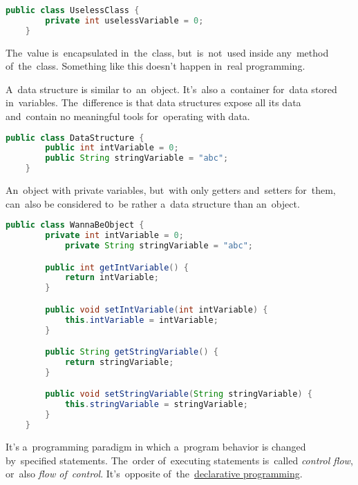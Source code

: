 \begin{lstlisting}[language=Java]
    public class UselessClass {
        private int uselessVariable = 0;
    }
\end{lstlisting}

\noindent The~value is~encapsulated in~the~class, but~is~not~used inside any~method of~the~class. Something like this doesn't happen in~real programming.

\label{objectdatastructure}
A~data structure is similar to~an~object. It's~also a~container for~data stored in~variables. The~difference is that data structures expose all its data and~contain no meaningful tools for~operating with data.

\begin{lstlisting}[language=Java]
    public class DataStructure {
        public int intVariable = 0;
        public String stringVariable = "abc";
    }
\end{lstlisting}

\noindent An~object with private variables, but~with only getters and~setters for~them, can~also be considered to~be rather a~data structure than an~object.

\begin{lstlisting}[language=Java]
    public class WannaBeObject {
        private int intVariable = 0;
            private String stringVariable = "abc";

        public int getIntVariable() {
            return intVariable;
        }

        public void setIntVariable(int intVariable) {
            this.intVariable = intVariable;
        }

        public String getStringVariable() {
            return stringVariable;
        }

        public void setStringVariable(String stringVariable) {
            this.stringVariable = stringVariable;
        }
    }
\end{lstlisting}

\label{imperativeprogramming}
It's a~programming paradigm in which a~program behavior is changed by~specified statements. The~order of~executing statements is~called \textit{control flow}, or~also \textit{flow of~control}. It's~opposite of~the~\hyperref[declarativeprogramming]{declarative programming}.


